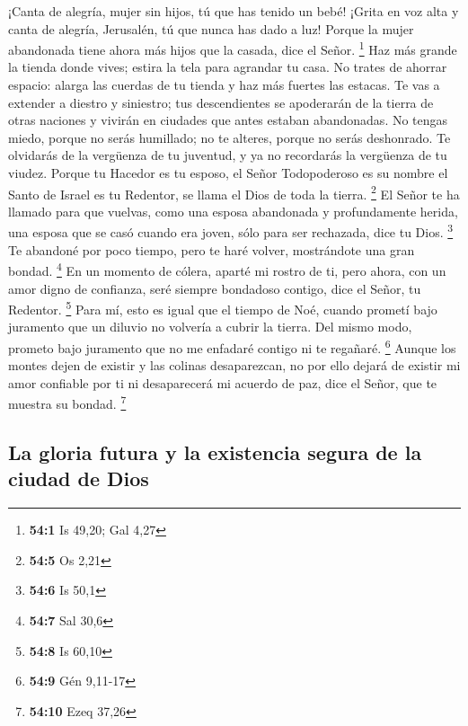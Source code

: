  ¡Canta de alegría, mujer sin hijos, tú que has tenido un
bebé! ¡Grita en voz alta y canta de alegría, Jerusalén, tú que nunca has
dado a luz! Porque la mujer abandonada tiene ahora más hijos que la
casada, dice el Señor. \footnote{\textbf{54:1} Is 49,20; Gal 4,27}
 Haz más grande la tienda donde vives; estira la tela para
agrandar tu casa. No trates de ahorrar espacio: alarga las cuerdas de tu
tienda y haz más fuertes las estacas.  Te vas a extender a
diestro y siniestro; tus descendientes se apoderarán de la tierra de
otras naciones y vivirán en ciudades que antes estaban abandonadas.
 No tengas miedo, porque no serás humillado; no te
alteres, porque no serás deshonrado. Te olvidarás de la vergüenza de tu
juventud, y ya no recordarás la vergüenza de tu viudez. 
Porque tu Hacedor es tu esposo, el Señor Todopoderoso es su nombre el
Santo de Israel es tu Redentor, se llama el Dios de toda la tierra.
\footnote{\textbf{54:5} Os 2,21}  El Señor te ha llamado
para que vuelvas, como una esposa abandonada y profundamente herida, una
esposa que se casó cuando era joven, sólo para ser rechazada, dice tu
Dios. \footnote{\textbf{54:6} Is 50,1}  Te abandoné por
poco tiempo, pero te haré volver, mostrándote una gran bondad.
\footnote{\textbf{54:7} Sal 30,6}  En un momento de
cólera, aparté mi rostro de ti, pero ahora, con un amor digno de
confianza, seré siempre bondadoso contigo, dice el Señor, tu Redentor.
\footnote{\textbf{54:8} Is 60,10}  Para mí, esto es igual
que el tiempo de Noé, cuando prometí bajo juramento que un diluvio no
volvería a cubrir la tierra. Del mismo modo, prometo bajo juramento que
no me enfadaré contigo ni te regañaré. \footnote{\textbf{54:9} Gén
  9,11-17}  Aunque los montes dejen de existir y las
colinas desaparezcan, no por ello dejará de existir mi amor confiable
por ti ni desaparecerá mi acuerdo de paz, dice el Señor, que te muestra
su bondad. \footnote{\textbf{54:10} Ezeq 37,26}

\hypertarget{la-gloria-futura-y-la-existencia-segura-de-la-ciudad-de-dios}{%
\subsection{La gloria futura y la existencia segura de la ciudad de
Dios}\label{la-gloria-futura-y-la-existencia-segura-de-la-ciudad-de-dios}}


